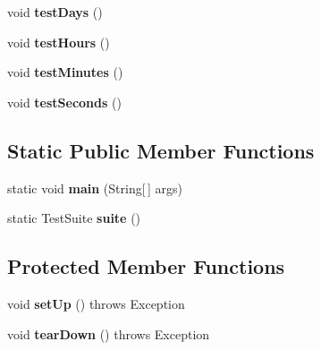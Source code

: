 \begin{DoxyCompactItemize}
\item 
\hypertarget{classorg_1_1joda_1_1time_1_1_test_string_convert_a0d9d19ece6ab5ecaf5a29b523cc6c9e7}{void {\bfseries test\-Days} ()}\label{classorg_1_1joda_1_1time_1_1_test_string_convert_a0d9d19ece6ab5ecaf5a29b523cc6c9e7}

\item 
\hypertarget{classorg_1_1joda_1_1time_1_1_test_string_convert_aaecf9b04e56b02116e6cb593bdd69f6d}{void {\bfseries test\-Hours} ()}\label{classorg_1_1joda_1_1time_1_1_test_string_convert_aaecf9b04e56b02116e6cb593bdd69f6d}

\item 
\hypertarget{classorg_1_1joda_1_1time_1_1_test_string_convert_ac2a6337a6f9e50cd3d66835b38ba8315}{void {\bfseries test\-Minutes} ()}\label{classorg_1_1joda_1_1time_1_1_test_string_convert_ac2a6337a6f9e50cd3d66835b38ba8315}

\item 
\hypertarget{classorg_1_1joda_1_1time_1_1_test_string_convert_adb54766439cd22a1ea197bafcb38b560}{void {\bfseries test\-Seconds} ()}\label{classorg_1_1joda_1_1time_1_1_test_string_convert_adb54766439cd22a1ea197bafcb38b560}

\end{DoxyCompactItemize}
\subsection*{Static Public Member Functions}
\begin{DoxyCompactItemize}
\item 
\hypertarget{classorg_1_1joda_1_1time_1_1_test_string_convert_a8d1f4d35b18aac730b58067a550ea050}{static void {\bfseries main} (String\mbox{[}$\,$\mbox{]} args)}\label{classorg_1_1joda_1_1time_1_1_test_string_convert_a8d1f4d35b18aac730b58067a550ea050}

\item 
\hypertarget{classorg_1_1joda_1_1time_1_1_test_string_convert_ac1b3f6d7006726c838b2bb3e76920549}{static Test\-Suite {\bfseries suite} ()}\label{classorg_1_1joda_1_1time_1_1_test_string_convert_ac1b3f6d7006726c838b2bb3e76920549}

\end{DoxyCompactItemize}
\subsection*{Protected Member Functions}
\begin{DoxyCompactItemize}
\item 
\hypertarget{classorg_1_1joda_1_1time_1_1_test_string_convert_a047a744a0639068ee91acedfa3571adf}{void {\bfseries set\-Up} ()  throws Exception }\label{classorg_1_1joda_1_1time_1_1_test_string_convert_a047a744a0639068ee91acedfa3571adf}

\item 
\hypertarget{classorg_1_1joda_1_1time_1_1_test_string_convert_a92a4f26590d9b9bd9c4b1383ac387a2e}{void {\bfseries tear\-Down} ()  throws Exception }\label{classorg_1_1joda_1_1time_1_1_test_string_convert_a92a4f26590d9b9bd9c4b1383ac387a2e}

\end{DoxyCompactItemize}


